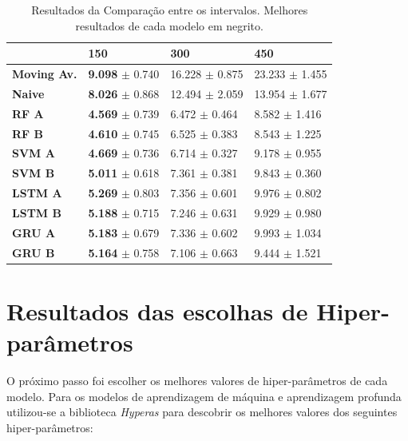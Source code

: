 \begin{table}[htbp]
    \begin{tabular*}{\linewidth}{@{\extracolsep{\fill}}llll}
    \toprule
     & 
    \multicolumn{1}{l}{\textbf{150}} & 
    \multicolumn{1}{l}{\textbf{300}} &
    \multicolumn{1}{l}{\textbf{450}} \\
    \midrule
    \textbf{Moving Av.} & \textbf{9.098} $\pm$ 0.740 & 16.228 $\pm$ 0.875 & 23.233 $\pm$ 1.455
    \\
    \midrule
    \textbf{Naive} & \textbf{8.026} $\pm$ 0.868 & 12.494 $\pm$ 2.059 & 13.954 $\pm$ 1.677
    \\
    \midrule
    \textbf{RF A} & \textbf{4.569} $\pm$ 0.739 & 6.472 $\pm$ 0.464 & 8.582 $\pm$ 1.416
    \\
    \midrule
    \textbf{RF B} & \textbf{4.610} $\pm$ 0.745 & 6.525 $\pm$ 0.383 & 8.543 $\pm$ 1.225
    \\
    \midrule
    \textbf{SVM A} & \textbf{4.669} $\pm$ 0.736 & 6.714 $\pm$ 0.327 & 9.178 $\pm$ 0.955
    \\
    \midrule
    \textbf{SVM B} & \textbf{5.011} $\pm$ 0.618 & 7.361 $\pm$ 0.381 & 9.843 $\pm$ 0.360
    \\
    \midrule
    \textbf{LSTM A} & \textbf{5.269} $\pm$ 0.803 & 7.356 $\pm$ 0.601 & 9.976 $\pm$ 0.802
    \\
    \midrule
    \textbf{LSTM B} & \textbf{5.188} $\pm$ 0.715 & 7.246 $\pm$ 0.631 & 9.929 $\pm$ 0.980
    \\
    \midrule
    \textbf{GRU A} & \textbf{5.183} $\pm$ 0.679 & 7.336 $\pm$ 0.602 & 9.993 $\pm$ 1.034
    \\
    \midrule
    \textbf{GRU B} & \textbf{5.164} $\pm$ 0.758 & 7.106 $\pm$ 0.663 & 9.444 $\pm$ 1.521
    \\
    \bottomrule
    \end{tabular*}
    \label{table:res_flow}
    \caption{Resultados da Comparação entre os intervalos. Melhores resultados de cada modelo em negrito.}
\end{table}


\section{Resultados das escolhas de Hiper-parâmetros}

O próximo passo foi escolher os melhores valores de hiper-parâmetros de cada modelo. Para os modelos de aprendizagem de máquina e aprendizagem profunda utilizou-se a biblioteca \textit{Hyperas} para descobrir os melhores valores dos seguintes hiper-parâmetros:

